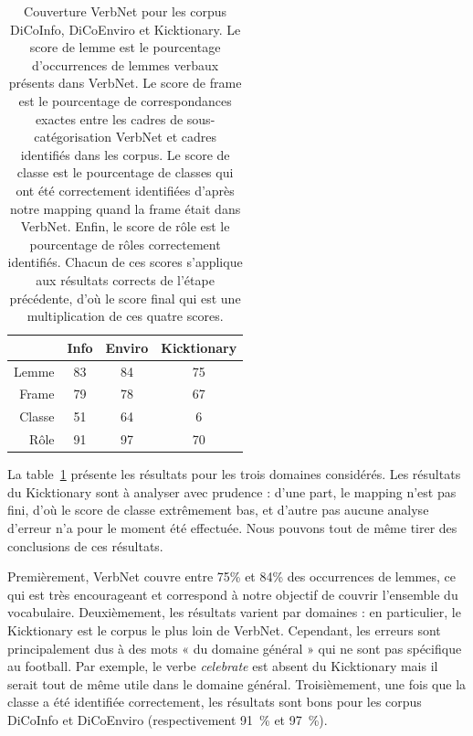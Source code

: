 \begin{table}[h]
\centering
\begin{tabular}{rccc}
  \toprule
         & Info & Enviro & Kicktionary \\
  \midrule
  Lemme  & 83 & 84 & 75 \\
  Frame  & 79 & 78 & 67 \\
  Classe & 51 & 64 & 6  \\
  Rôle   & 91 & 97 & 70 \\
  \bottomrule
\end{tabular}

\caption{\label{table:coverage} Couverture VerbNet pour les corpus DiCoInfo,
    DiCoEnviro et Kicktionary. Le score de lemme est le pourcentage
    d'occurrences de lemmes verbaux présents dans VerbNet. Le score de frame
    est le pourcentage de correspondances exactes entre les cadres de
    sous-catégorisation VerbNet et cadres identifiés dans les corpus. Le score
    de classe est le pourcentage de classes qui ont été correctement
    identifiées d'après notre mapping quand la frame était dans VerbNet. Enfin,
    le score de rôle est le pourcentage de rôles correctement identifiés.
    Chacun de ces scores s'applique aux résultats corrects de l'étape
    précédente, d'où le score final qui est une multiplication de ces quatre
    scores.}

\end{table}

La table~\ref{table:coverage} présente les résultats pour les trois domaines
considérés. Les résultats du Kicktionary sont à analyser avec prudence : d'une
part, le mapping n'est pas fini, d'où le score de classe extrêmement bas, et
d'autre pas aucune analyse d'erreur n'a pour le moment été effectuée. Nous
pouvons tout de même tirer des conclusions de ces résultats.

Premièrement, VerbNet couvre entre 75\% et 84\% des occurrences de lemmes, ce
qui est très encourageant et correspond à notre objectif de couvrir l'ensemble
du vocabulaire.
Deuxièmement, les résultats varient par domaines : en particulier, le
Kicktionary est le corpus le plus loin de VerbNet. Cependant, les erreurs sont
principalement dus à des mots « du domaine général » qui ne sont pas spécifique
au football. Par exemple, le verbe \emph{celebrate} est absent du Kicktionary
mais il serait tout de même utile dans le domaine général.
Troisièmement, une fois que la classe a été identifiée correctement, les
résultats sont bons pour les corpus DiCoInfo et DiCoEnviro (respectivement
91~\% et 97~\%).

